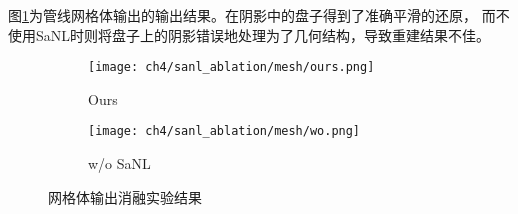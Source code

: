 图\ref{fig:mesh_ablation}为管线网格体输出的输出结果。在阴影中的盘子得到了准确平滑的还原，
而不使用SaNL时则将盘子上的阴影错误地处理为了几何结构，导致重建结果不佳。

\begin{figure}[H]
  \centering
  \begin{subfigure}[c]{0.47\textwidth}
    \centering
    \texttt{[image: ch4/sanl\_ablation/mesh/ours.png]}
    \caption{Ours}
  \end{subfigure}
  \begin{subfigure}[c]{0.47\textwidth}
    \centering
    \texttt{[image: ch4/sanl\_ablation/mesh/wo.png]}
    \caption{w/o SaNL}
  \end{subfigure}
  \caption{网格体输出消融实验结果}
  \label{fig:mesh_ablation}
\end{figure}



